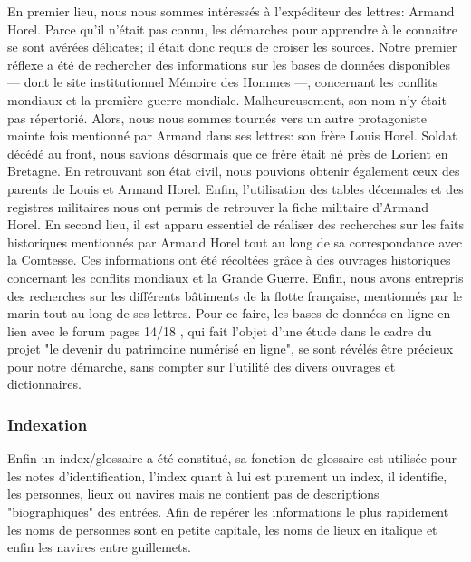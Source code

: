 \documentclass[12pt,a4paper]{book} %
\begin{document}
En premier lieu, nous nous sommes intéressés à l'expéditeur des lettres: Armand Horel. Parce qu'il n'était pas connu, les démarches pour apprendre à le connaitre se sont avérées délicates; il était donc requis de croiser les sources. Notre premier réflexe a été de rechercher des informations sur les bases de données disponibles --- dont le site institutionnel \og Mémoire des Hommes \fg{} ---, concernant les conflits mondiaux et la première guerre mondiale. Malheureusement, son nom n'y était pas répertorié. Alors, nous nous sommes tournés vers un autre protagoniste mainte fois mentionné par Armand dans ses lettres: son frère Louis Horel. Soldat décédé au front, nous savions désormais que ce frère était né près de Lorient en Bretagne. En retrouvant son état civil, nous pouvions obtenir également ceux des parents de Louis et Armand Horel. Enfin, l'utilisation des tables décennales et des registres militaires nous ont permis de retrouver la fiche militaire d'Armand Horel. En second lieu, il est apparu essentiel de réaliser des recherches sur les faits historiques mentionnés par Armand Horel tout au long de sa correspondance avec la Comtesse. Ces informations ont été récoltées grâce à des ouvrages historiques concernant les conflits mondiaux et la Grande Guerre. 
Enfin, nous avons entrepris des recherches sur les différents bâtiments de la flotte française, mentionnés par le marin tout au long de ses lettres. Pour ce faire, les bases de données en ligne en lien avec le forum \og pages 14/18 \fg{}, qui fait l'objet d'une étude dans le cadre du projet "le devenir du patrimoine numérisé en ligne", se sont révélés être précieux pour notre démarche, sans compter sur l'utilité des divers ouvrages et dictionnaires. 

\subsubsection{Indexation}
Enfin un index/glossaire a été constitué, sa fonction de glossaire est utilisée pour les notes d'identification, l'index quant à lui est purement un index, il identifie, les personnes, lieux ou navires mais ne contient pas de descriptions "biographiques" des entrées. Afin de repérer les informations le plus rapidement les noms de personnes sont en petite capitale, les noms de lieux en italique et enfin les navires entre guillemets.
\end{document}
